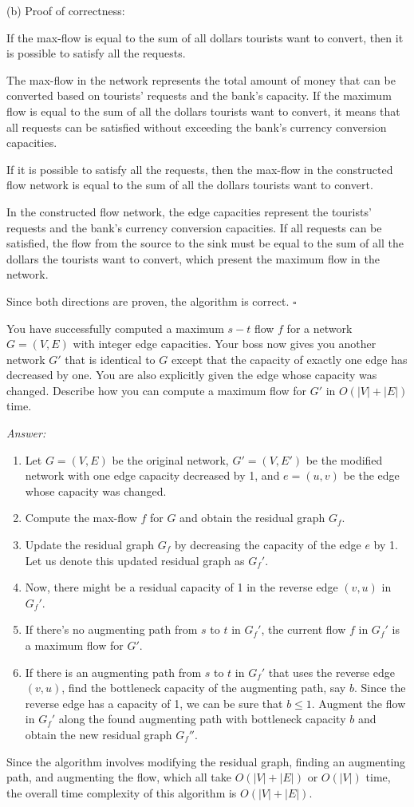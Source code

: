 \documentclass[12pt]{article}
\newenvironment{problem}[2][Problem]{\begin{trivlist}
\item[\hskip \labelsep {\bfseries #1}\hskip \labelsep {\bfseries #2.}]}{\end{trivlist}}
\begin{document}
(b) Proof of correctness:

If the max-flow is equal to the sum of all dollars tourists want to convert, then it is possible to satisfy all the requests. 

The max-flow in the network represents the total amount of money that can be converted based on tourists' requests and the bank's capacity. If the maximum flow is equal to the sum of all the dollars tourists want to convert, it means that all requests can be satisfied without exceeding the bank's currency conversion capacities.

If it is possible to satisfy all the requests, then the max-flow in the constructed flow network is equal to the sum of all the dollars tourists want to convert.

In the constructed flow network, the edge capacities represent the tourists' requests and the bank's currency conversion capacities. If all requests can be satisfied, the flow from the source to the sink must be equal to the sum of all the dollars the tourists want to convert, which present the maximum flow in the network.

Since both directions are proven, the algorithm is correct. $\square$

\begin{problem}{5}
You have successfully computed a maximum $s-t$ flow $f$ for a network $G=(V,E)$ with integer edge capacities. Your boss now gives you another network $G'$ that is identical to $G$ except that the capacity of exactly one edge has decreased by one. You are also explicitly given the edge whose capacity was changed. Describe how you can compute a maximum flow for $G'$ in $O(|V|+|E|)$ time.
\end{problem}

\textit{Answer:}

\begin{enumerate}
\item Let $G=(V,E)$ be the original network, $G'=(V,E')$ be the modified network with one edge capacity decreased by 1, and $e=(u,v)$ be the edge whose capacity was changed.
\item Compute the max-flow $f$ for $G$ and obtain the residual graph $G_f$.
\item Update the residual graph $G_f$ by decreasing the capacity of the edge $e$ by 1. Let us denote this updated residual graph as $G_f'$.
\item Now, there might be a residual capacity of 1 in the reverse edge $(v, u)$ in $G_f'$.
\item If there's no augmenting path from $s$ to $t$ in $G_f'$, the current flow $f$ in $G_f'$ is a maximum flow for $G'$.
\item If there is an augmenting path from $s$ to $t$ in $G_f'$ that uses the reverse edge $(v, u)$, find the bottleneck capacity of the augmenting path, say $b$. Since the reverse edge has a capacity of 1, we can be sure that $b \leq 1$. Augment the flow in $G_f'$ along the found augmenting path with bottleneck capacity $b$ and obtain the new residual graph $G_f''$.
\end{enumerate}

Since the algorithm involves modifying the residual graph, finding an augmenting path, and augmenting the flow, which all take $O(|V|+|E|)$ or $O(|V|)$ time, the overall time complexity of this algorithm is $O(|V|+|E|)$.
\end{document}
